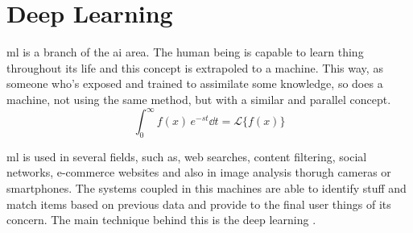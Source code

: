 \section{Deep Learning}\label{sec:deep_learning}

\gls*{ml} is a branch of the \gls*{ai} area. The human being is capable to learn thing throughout its life and this concept is extrapoled to a machine. This way, as someone who's exposed and trained to assimilate some knowledge, so does a machine, not using the same method, but with a similar and parallel concept.
%
\begin{equation}
    \int_0^{\infty} f(x) \, e^{-st} \dd{t} = \mathcal{L}\{f(x)\}
\end{equation}

\gls*{ml} is used in several fields, such as, web searches, content filtering, social networks, e-commerce websites and also in image analysis thorugh cameras or smartphones. The systems coupled in this machines are able to identify stuff and match items based on previous data and provide to the final user things of its concern. The main technique behind this is the deep learning \citep{lecun_deep_2015}. 
